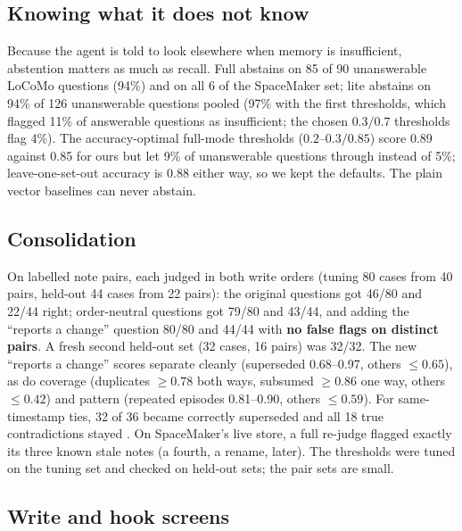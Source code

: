 \subsection{Knowing what it does not know}

Because the agent is told to look elsewhere when memory is insufficient, abstention matters as much as recall. Full abstains on 85 of 90 unanswerable LoCoMo questions (94\%) and on all 6 of the SpaceMaker set; lite abstains on 94\% of 126 unanswerable questions pooled (97\% with the first thresholds, which flagged 11\% of answerable questions as insufficient; the chosen $0.3/0.7$ thresholds flag 4\%). The accuracy-optimal full-mode thresholds ($0.2$--$0.3/0.85$) score 0.89 against 0.85 for ours but let 9\% of unanswerable questions through instead of 5\%; leave-one-set-out accuracy is 0.88 either way, so we kept the defaults. The plain vector baselines can never abstain.

\subsection{Consolidation}

On labelled note pairs, each judged in both write orders (tuning 80 cases from 40 pairs, held-out 44 cases from 22 pairs): the original questions got 46/80 and 22/44 right; order-neutral questions got 79/80 and 43/44, and adding the ``reports a change'' question 80/80 and 44/44 with \textbf{no false flags on distinct pairs}. A fresh second held-out set (32 cases, 16 pairs) was 32/32. The new ``reports a change'' scores separate cleanly (superseded 0.68--0.97, others $\le 0.65$), as do coverage (duplicates $\ge 0.78$ both ways, subsumed $\ge 0.86$ one way, others $\le 0.42$) and pattern (repeated episodes 0.81--0.90, others $\le 0.59$). For same-timestamp ties, 32 of 36 became correctly superseded and all 18 true contradictions stayed . On SpaceMaker's live store, a full re-judge flagged exactly its three known stale notes (a fourth, a rename, later). The thresholds were tuned on the tuning set and checked on held-out sets; the pair sets are small.

\subsection{Write and hook screens}

